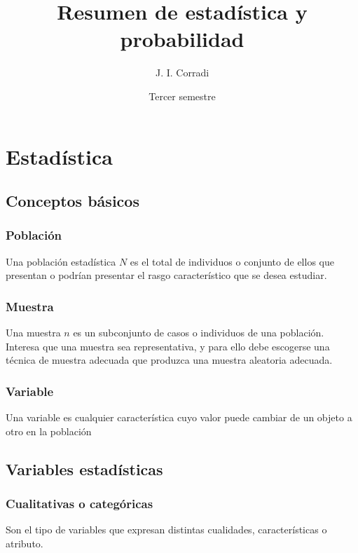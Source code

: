 \documentclass{report}
\title{Resumen de estadística y probabilidad}
\date{Tercer semestre}
\author{J. I. Corradi}
\begin{document}
  \maketitle
  \setcounter{tocdepth}{5}
  \tableofcontents
  \newpage

  \chapter*{Estadística}

    \section*{Conceptos básicos}

      \subsection*{Población}
        Una población estadística $N$ es el total de individuos o conjunto de 
        ellos que presentan o podrían presentar el rasgo característico que se 
        desea estudiar.

      \subsection*{Muestra}
      Una muestra $n$ es un subconjunto de casos o individuos de una población. 
      Interesa que una muestra sea representativa, y para ello debe escogerse 
      una técnica de muestra adecuada que produzca una muestra aleatoria adecuada.

      \subsection*{Variable}
       Una variable es cualquier característica cuyo valor puede cambiar de un 
       objeto a otro en la población
         
    \section*{Variables estadísticas}

      \subsection*{Cualitativas o categóricas}
        Son el tipo de variables que expresan distintas cualidades, características 
        o atributo.
\end{document}
